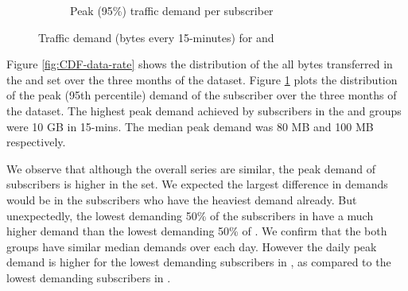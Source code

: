 \begin{figure}[t]
\begin{minipage}{1\linewidth}
\begin{subfigure}[b]{.49\linewidth}
               \caption{Peak (95\%) traffic demand per subscriber\label{fig:CDF-data-rate-perc95}}
\end{subfigure}
%
\end{minipage}
\caption{Traffic demand (bytes every 15-minutes) for \control{} and \treatment{}\label{fig:traffic-demand-cdf}}
\end{figure}

Figure \ref{fig:CDF-data-rate} shows the distribution of the
all bytes transferred in the \treatment{} and \control{} set
over the three months of the dataset. Figure \ref{fig:CDF-data-rate-perc95}
plots the distribution of the peak (95th percentile) demand of the
subscriber over the three months of the dataset. The highest peak
demand achieved by subscribers in the \control{} and \treatment{}
groups were 10 GB in 15-mins. The median peak demand was 80 MB and
100 MB respectively.

We observe that although the overall series are similar, the peak demand of subscribers
is higher in the \treatment{} set. We expected the largest difference
in demands would be in the subscribers who have the heaviest demand already.
But unexpectedly, the lowest demanding 50\% of the subscribers in
\treatment{} have a much higher demand than the lowest demanding 50\% of \control{}.
We confirm that the both groups have similar median demands over each day. However
the daily peak demand is higher for the lowest demanding subscribers in
 \treatment{}, as compared to the lowest demanding subscribers in \control{}.


